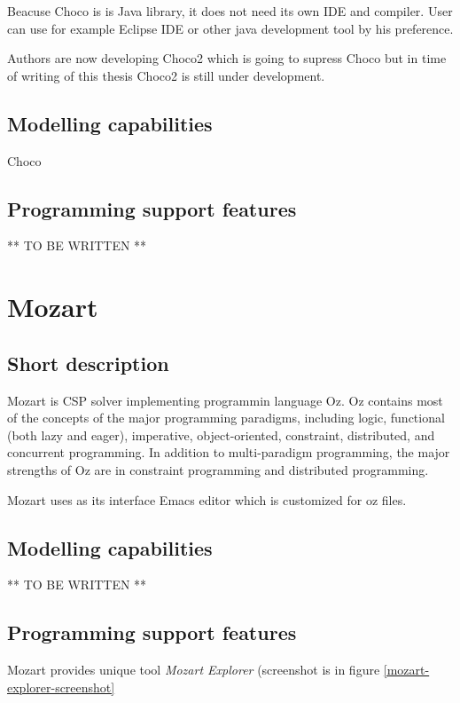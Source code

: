 Beacuse Choco is is Java library, it does not need its own IDE and compiler. User can
use for example Eclipse IDE or other java development tool by his preference.

Authors are now developing Choco2 which is going to supress Choco but in time of 
writing of this thesis Choco2 is still under development.

\subsection{Modelling capabilities}

Choco 

\subsection{Programming support features}

** TO BE WRITTEN **

\section{Mozart}

\subsection{Short description}

Mozart is CSP solver implementing programmin language Oz. Oz contains most of the 
concepts of the major programming paradigms, including logic, functional (both 
lazy and eager), imperative, object-oriented, constraint, distributed, and 
concurrent programming. In addition to multi-paradigm programming, the major 
strengths of Oz are in constraint programming and distributed programming.

Mozart uses as its interface Emacs editor which is customized for oz files.  

\subsection{Modelling capabilities}

** TO BE WRITTEN **

\subsection{Programming support features}

Mozart provides unique tool {\em Mozart Explorer} (screenshot is in figure \ref{mozart-explorer-screenshot}

